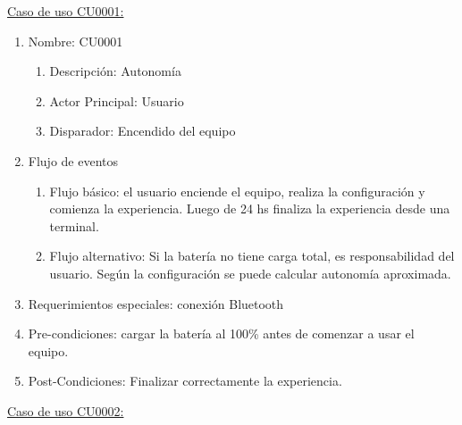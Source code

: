 	\underline{Caso de uso CU0001:}

	\begin{enumerate} 
		\item Nombre: CU0001
		\begin{enumerate} [label*=\arabic*.]
			\item Descripción: Autonomía
			\item Actor Principal: Usuario
			\item Disparador: Encendido del equipo		
		\end{enumerate}
		\item Flujo de eventos
		\begin{enumerate} [label*=\arabic*.]
			\item Flujo básico: el usuario enciende el equipo, realiza la configuración y comienza la experiencia. Luego de 24 hs finaliza la experiencia desde una terminal.
			\item Flujo alternativo: Si la batería no tiene carga total, es responsabilidad del usuario. Según la configuración se puede calcular autonomía aproximada.
		\end{enumerate}

		\item Requerimientos especiales: conexión Bluetooth
		\item Pre-condiciones: cargar la batería al 100\% antes de comenzar a usar el equipo.
		\item Post-Condiciones: Finalizar correctamente la experiencia.				
	\end{enumerate}

	\underline{Caso de uso CU0002:}

